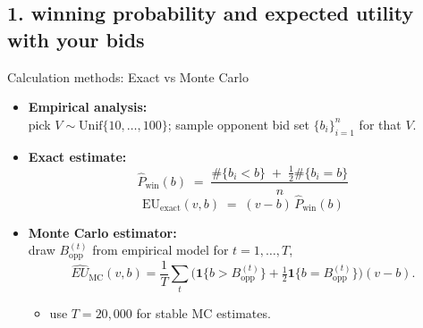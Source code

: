 \documentclass{beamer}
\begin{document}
\subsection{1. winning probability and expected utility with your bids}
\begin{frame}{Calculation methods: Exact \; vs \; Monte Carlo}
\medskip
\begin{itemize}
  \item \textbf{Empirical analysis:}\\
  pick $V\sim\mathrm{Unif}\{10,\dots,100\}$; sample opponent bid set $\{b_i\}_{i=1}^n$ for that $V$.
  \item \textbf{Exact estimate:}\\
    {\centering
    \[
    \widehat{P}_{\mathrm{win}}(b)
    \;=\;\frac{\#\{b_i < b\} \;+\; \tfrac{1}{2}\#\{b_i = b\}}{n}
    \]
    \[
    \mathrm{EU}_{\mathrm{exact}}(v,b)
    \;=\; (v - b)\,\widehat{P}_{\mathrm{win}}(b)
    \]}
  \item \textbf{Monte Carlo estimator:} \\
  draw $B_{\text{opp}}^{(t)}$ from empirical model for $t=1,\dots,T$,
    \[
      \widehat{EU}_{\text{MC}}(v,b)=\frac{1}{T}\sum_{t}\Big(\mathbf{1}\{b>B_{\text{opp}}^{(t)}\}+\tfrac12\mathbf{1}\{b=B_{\text{opp}}^{(t)}\}\Big)(v-b).
    \]
    \begin{itemize}
        \item use $T=20{,}000$ for stable MC estimates.
    \end{itemize}
\end{itemize}
\end{frame}
\end{document}
